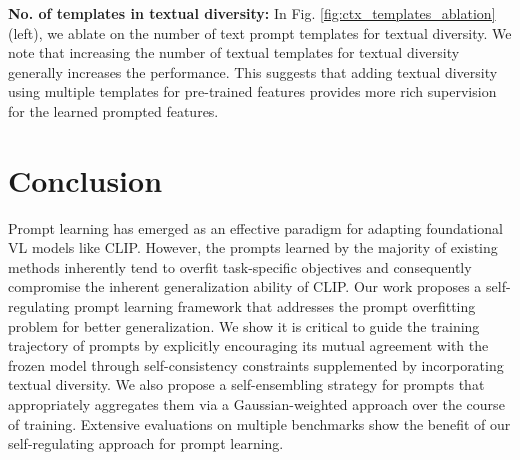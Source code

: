 \documentclass[10pt,twocolumn,letterpaper]{article}
\begin{document}
\noindent \textbf{No. of templates in textual diversity:}
In Fig. \ref{fig:ctx_templates_ablation} (left), we ablate on the number of text prompt templates for textual diversity. We note that increasing the number of textual templates for textual diversity generally increases the performance. This suggests that adding textual diversity using multiple templates for pre-trained features provides more rich supervision for the learned prompted features.

\section{Conclusion}\vspace{-0.5em}
Prompt learning has emerged as an effective paradigm for adapting foundational VL models like CLIP. However, the prompts learned by the majority of existing methods inherently tend to overfit task-specific objectives and consequently compromise the inherent generalization ability of CLIP. Our work proposes a self-regulating prompt learning framework that addresses the prompt overfitting problem for better generalization. We show it is critical to guide the training trajectory of prompts by explicitly encouraging its mutual agreement with the frozen model through self-consistency constraints supplemented by incorporating textual diversity. We also propose a self-ensembling strategy for prompts that appropriately aggregates them via a Gaussian-weighted approach over the course of training. Extensive evaluations on multiple benchmarks show the benefit of our self-regulating approach for prompt learning.

{\small


}

\newpage

\appendix
\end{document}
